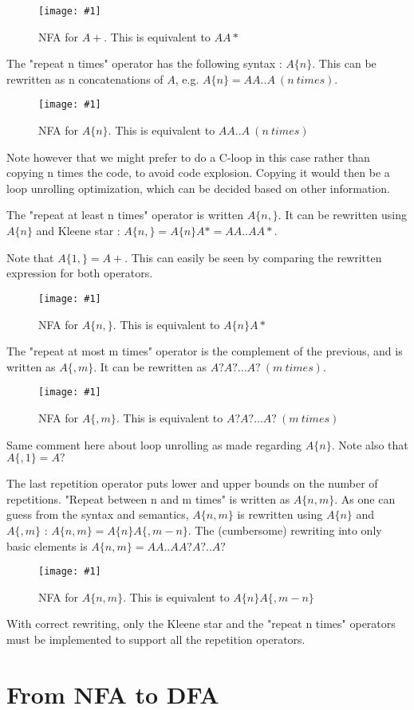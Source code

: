\documentclass[11pt,a4paper]{report}
\newcommand{\regexp}[1]{$#1$}
\newcommand{\insertfa}[3]{
\begin{figure}[h!]
	\centering
	\texttt{[image: \#1]}
	\caption{#2}
\end{figure}
}
\newcommand{\smallnfa}[2]{\insertfa{./img/nfa/#1.png}{NFA for #2}{scale=0.7}}
\newcommand{\largenfa}[2]{\insertfa{./img/nfa/#1.png}{NFA for #2}{width=\textwidth}}
\begin{document}
\smallnfa{repeat-at-least-once}{\regexp{A+}. This is equivalent to \regexp{AA*}}

The "repeat n times" operator has the following syntax : \regexp{A\{n\}}. This can be rewritten as n concatenations of $A$, e.g. \regexp{A\{n\} = AA..A\ (n\ times)}.

\smallnfa{repeat-n-times}{\regexp{A\{n\}}. This is equivalent to \regexp{AA..A\ (n\ times)}}

Note however that we might prefer to do a C-loop in this case rather than copying n times the code, to avoid code explosion. Copying it would then be a loop unrolling optimization, which can be decided based on other information.

The "repeat at least n times" operator is written \regexp{A\{n,\}}. It can be rewritten using \regexp{A\{n\}} and Kleene star : \regexp{A\{n,\} = A\{n\}A* = AA..AA*}.

Note that \regexp{A\{1,\} = A+}. This can easily be seen by comparing the rewritten expression for both operators.

\largenfa{repeat-at-least-n-times}{\regexp{A\{n,\}}. This is equivalent to \regexp{A\{n\}A*}}

The "repeat at most m times" operator is the complement of the previous, and is written as \regexp{A\{,m\}}. It can be rewritten as \regexp{A?A?...A?\ (m\ times)}.

\largenfa{repeat-at-most-m-times}{\regexp{A\{,m\}}. This is equivalent to \regexp{A?A?...A?\ (m\ times)}}

Same comment here about loop unrolling as made regarding \regexp{A\{n\}}. Note also that \regexp{A\{,1\} = A?}

The last repetition operator puts lower and upper bounds on the number of repetitions. "Repeat between n and m times" is written as \regexp{A\{n, m\}}. As one can guess from the syntax and semantics, \regexp{A\{n, m\}} is rewritten using \regexp{A\{n\}} and \regexp{A\{, m\}} : \regexp{A\{n, m\} = A\{n\}A\{, m-n\}}. The (cumbersome) rewriting into only basic elements is \regexp{A\{n, m\} = AA..AA?A?..A?}

\largenfa{repeat-between-n-and-m-times}{\regexp{A\{n,m\}}. This is equivalent to \regexp{A\{n\}A\{,m-n\}}}

With correct rewriting, only the Kleene star and the "repeat n times" operators must be implemented to support all the repetition operators.

\section{From NFA to DFA}
\label{nfatodfa}
\end{document}
